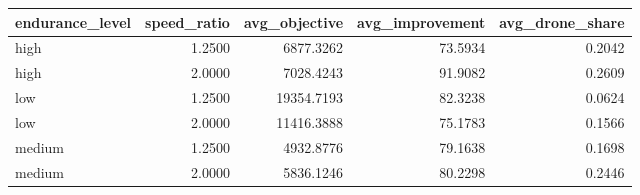 \begin{tabular}{lrrrr}
\toprule
endurance_level & speed_ratio & avg_objective & avg_improvement & avg_drone_share \\
\midrule
high & 1.2500 & 6877.3262 & 73.5934 & 0.2042 \\
high & 2.0000 & 7028.4243 & 91.9082 & 0.2609 \\
low & 1.2500 & 19354.7193 & 82.3238 & 0.0624 \\
low & 2.0000 & 11416.3888 & 75.1783 & 0.1566 \\
medium & 1.2500 & 4932.8776 & 79.1638 & 0.1698 \\
medium & 2.0000 & 5836.1246 & 80.2298 & 0.2446 \\
\bottomrule
\end{tabular}
